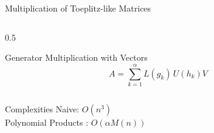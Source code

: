 \begin{frame}{Multiplication of Toeplitz-like Matrices}
  \begin{columns}
    \begin{column}{0.5\textwidth}
      \begin{block}{Generator Multiplication with Vectors}
        \[
          A = \sum_{k=1}^{\alpha} L(g_k)\, U(h_k) V
        \]
      \end{block}
    \end{column}
  \end{columns}
  \vspace{1em}
  \begin{block}{Complexities}
    Naive: $O(n^3)$           \\
    Polynomial Products : $O(\alpha M(n))$
  \end{block}
\end{frame}
